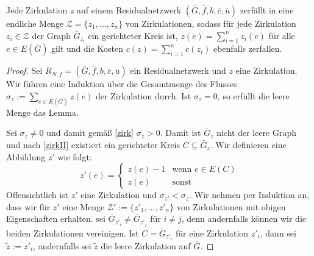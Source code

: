 \begin{lem}\label{zerl}Jede Zirkulation $z$ auf einem Residualnetzwerk $(\bar{G},\bar{f},b,\bar{c},\bar{u})$ zerfällt in eine endliche Menge $\mathscr{Z}=\{z_1,\ldots,z_n\}$ von Zirkulationen, sodass für jede Zirkulation $z_i\in\mathscr{Z}$ der Graph $\bar{G}_{z_i}$ ein gerichteter Kreis ist, $z(e)=\sum_{i=1}^{n} z_i(e)$ für alle $e\in E(\bar{G})$ gilt und die Kosten $c(z)=\sum_{i=1}^{n} c(z_i)$ ebenfalls zerfallen.\end{lem}
\begin{proof}Sei $R_{N,f}= (\bar{G},\bar{f},b,\bar{c},\bar{u})$ ein Residualnetzwerk und $z$ eine Zirkulation. Wir führen eine Induktion über die Gesamtmenge des Flusses $\sigma_z:=\sum_{e\in E(\bar{G})}z(e)$ der Zirkulation durch. Ist $\sigma_z=0$, so erfüllt die leere Menge das Lemma.
    
Sei $\sigma_z\neq0$ und damit gemäß \cref{zirk} $\sigma_z>0$. Damit ist $\bar{G}_z$ nicht der leere Graph und nach \cref{zirkII} existiert ein gerichteter Kreis $C\subseteq \bar{G}_z$. Wir definieren eine Abbildung $z'$ wie folgt:
\begin{equation*}z'(e)=\begin{cases}
z(e)-1&\text{wenn }e\in E(C)\\
z(e)&\text{sonst}\end{cases}
\end{equation*}
Offensichtlich ist $z'$ eine Zirkulation und $\sigma_{z'}<\sigma_z$. Wir nehmen per Induktion an, dass wir für $z'$ eine Menge $\mathscr{Z}':=\{z'_1,\ldots,z'_n\}$ von Zirkulationen mit obigen Eigenschaften erhalten. \Obda sei $\bar{G}_{z'_i}\neq\bar{G}_{z'_j}$ für $i\neq j$, denn andernfalls können wir die beiden Zirkulationen vereinigen. Ist $C=\bar{G}_{z'_i}$ für eine Zirkulation $z'_i$, dann sei $\tilde{z}:=z'_i$, andernfalls sei $\tilde{z}$ die leere Zirkulation auf $\bar{G}$.


\end{proof}
